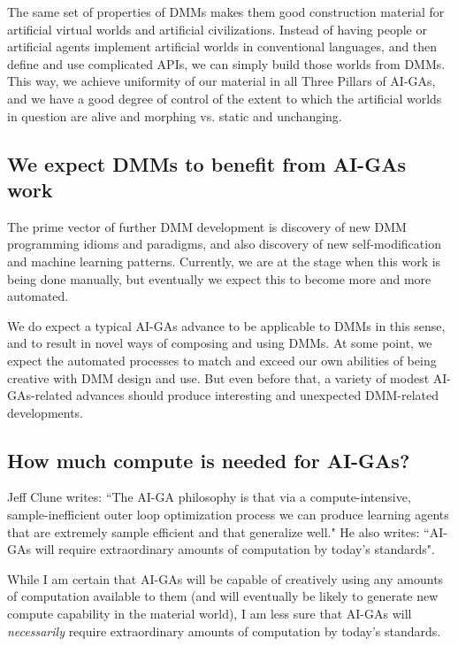 \documentclass{article}
\begin{document}
The same set of properties of DMMs makes them good construction material for artificial virtual worlds and
artificial civilizations. Instead of having people or artificial agents implement artificial worlds in conventional languages,
and then define and use complicated APIs, we can simply build those worlds from DMMs. This way, we achieve uniformity
of our material in all Three Pillars of AI-GAs, and we have a good degree of control of the extent to which the
artificial worlds in question are alive and morphing vs. static and unchanging.

\subsection{We expect DMMs to benefit from AI-GAs work}

The prime vector of further DMM development is discovery of new DMM programming idioms
and paradigms, and also discovery of new self-modification and machine learning patterns.
Currently, we are at the stage when this work is being done manually, but eventually we
expect this to become more and more automated.

We do expect a typical AI-GAs advance to be applicable to DMMs in this sense, and to result
in novel ways of composing and using DMMs. At some point, we expect the automated processes
to match and exceed our own abilities of being creative with DMM design and use. But even before that,
a variety of modest AI-GAs-related advances should produce interesting and unexpected DMM-related developments.

\subsection{How much compute is needed for AI-GAs?}\label{sec:compute}

Jeff Clune writes: ``The AI-GA philosophy is that via a compute-intensive, 
sample-inefficient outer loop optimization process we can produce learning agents that are extremely sample efficient and that generalize well." He also writes: ``AI-GAs will require extraordinary amounts of computation by today’s standards".

While I am certain that AI-GAs will be capable of creatively using any amounts of computation
available to them (and will eventually be likely to generate new compute capability in the material world), 
I am less sure that AI-GAs will {\em necessarily} require extraordinary amounts of computation by today's standards.
\end{document}
